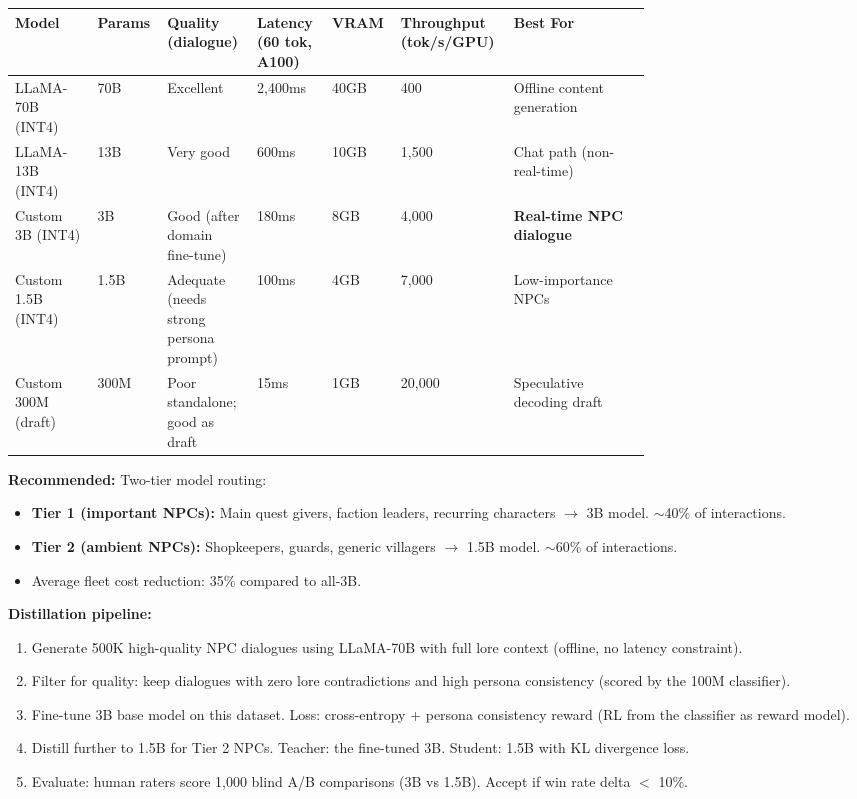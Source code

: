 {\small
\begin{tabular}{|p{0.12\linewidth}|p{0.06\linewidth}|p{0.1\linewidth}|p{0.1\linewidth}|p{0.06\linewidth}|p{0.1\linewidth}|p{0.2\linewidth}|}
\hline
\textbf{Model} & \textbf{Params} & \textbf{Quality (dialogue)} & \textbf{Latency (60 tok, A100)} & \textbf{VRAM} & \textbf{Throughput (tok/s/GPU)} & \textbf{Best For} \\
\hline
LLaMA-70B (INT4) & 70B & Excellent & 2,400ms & 40GB & 400 & Offline content generation \\
\hline
LLaMA-13B (INT4) & 13B & Very good & 600ms & 10GB & 1,500 & Chat path (non-real-time) \\
\hline
Custom 3B (INT4) & 3B & Good (after domain fine-tune) & 180ms & 8GB & 4,000 & \textbf{Real-time NPC dialogue} \\
\hline
Custom 1.5B (INT4) & 1.5B & Adequate (needs strong persona prompt) & 100ms & 4GB & 7,000 & Low-importance NPCs \\
\hline
Custom 300M (draft) & 300M & Poor standalone; good as draft & 15ms & 1GB & 20,000 & Speculative decoding draft \\
\hline
\end{tabular}
}

\bigskip
\textbf{Recommended:} Two-tier model routing:
\begin{itemize}
  \item \textbf{Tier 1 (important NPCs):} Main quest givers, faction leaders, recurring characters $\rightarrow$ 3B model. $\sim$40\% of interactions.
  \item \textbf{Tier 2 (ambient NPCs):} Shopkeepers, guards, generic villagers $\rightarrow$ 1.5B model. $\sim$60\% of interactions.
  \item Average fleet cost reduction: 35\% compared to all-3B.
\end{itemize}

\textbf{Distillation pipeline:}

\begin{enumerate}
  \item Generate 500K high-quality NPC dialogues using LLaMA-70B with full lore context (offline, no latency constraint).
  \item Filter for quality: keep dialogues with zero lore contradictions and high persona consistency (scored by the 100M classifier).
  \item Fine-tune 3B base model on this dataset. Loss: cross-entropy + persona consistency reward (RL from the classifier as reward model).
  \item Distill further to 1.5B for Tier 2 NPCs. Teacher: the fine-tuned 3B. Student: 1.5B with KL divergence loss.
  \item Evaluate: human raters score 1,000 blind A/B comparisons (3B vs 1.5B). Accept if win rate delta $<$ 10\%.
\end{enumerate}

